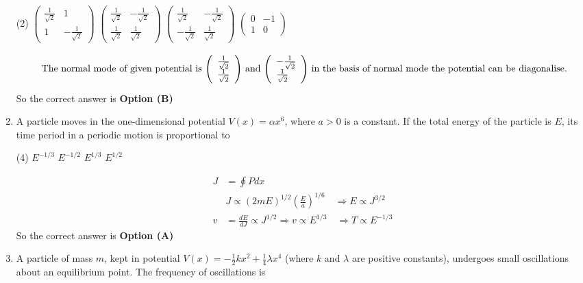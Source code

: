 \begin{enumerate}
\begin{tasks}(2)
\task[\textbf{A.}] $\left(\begin{array}{cc}\frac{1}{\sqrt{2}} & 1 \\ 1 & -\frac{1}{\sqrt{2}}\end{array}\right)$
\task[\textbf{B.}] $\left(\begin{array}{ll}\frac{1}{\sqrt{2}} & -\frac{1}{\sqrt{2}} \\ \frac{1}{\sqrt{2}} & \frac{1}{\sqrt{2}}\end{array}\right)$
\task[\textbf{C.}] $\left(\begin{array}{cc}\frac{1}{\sqrt{2}} & -\frac{1}{\sqrt{2}} \\ -\frac{1}{\sqrt{2}} & \frac{1}{\sqrt{2}}\end{array}\right)$
\task[\textbf{D.}] $\left(\begin{array}{cc}0 & -1 \\ 1 & 0\end{array}\right)$
\end{tasks}
\begin{answer}
\begin{align*}
\intertext{ The normal mode of given potential is $\left(\begin{array}{l}\frac{1}{\sqrt{2}} \\ \frac{1}{\sqrt{2}}\end{array}\right)$ and $\left(\begin{array}{l}-\frac{1}{\sqrt{2}} \\ \frac{1}{\sqrt{2}}\end{array}\right)$ in the basis of normal mode the potential can be diagonalise.}
\end{align*}
So the correct answer is \textbf{Option (B)}
\end{answer}
	\item  A particle moves in the one-dimensional potential $V(x)=\alpha x^{6}$, where $a>0$ is a constant. If the total energy of the particle is $E$, its time period in a periodic motion is proportional to
{	}
\begin{tasks}(4)
\task[\textbf{A.}] $E^{-1 / 3}$
\task[\textbf{B.}] $E^{-1 / 2}$
\task[\textbf{C.}] $E^{1 / 3}$
\task[\textbf{D.}] $E^{1 / 2}$
\end{tasks}
\begin{answer}
\begin{align*}
J&=\oint P d x\\
&J \propto(2 m E)^{1 / 2}\left(\frac{E}{a}\right)^{1 / 6} \quad \Rightarrow E \propto J^{3 / 2} \\ v&=\frac{d E}{d J} \propto J^{1 / 2} \Rightarrow v \propto E^{1 / 3} \quad \Rightarrow T \propto E^{-1 / 3}
\end{align*}
So the correct answer is \textbf{Option (A)}
\end{answer}
	\item A particle of mass $m$, kept in potential $V(x)=-\frac{1}{2} k x^{2}+\frac{1}{4} \lambda x^{4}$ (where $k$ and $\lambda$ are positive constants), undergoes small oscillations about an equilibrium point. The frequency of oscillations is
	

\end{enumerate}
